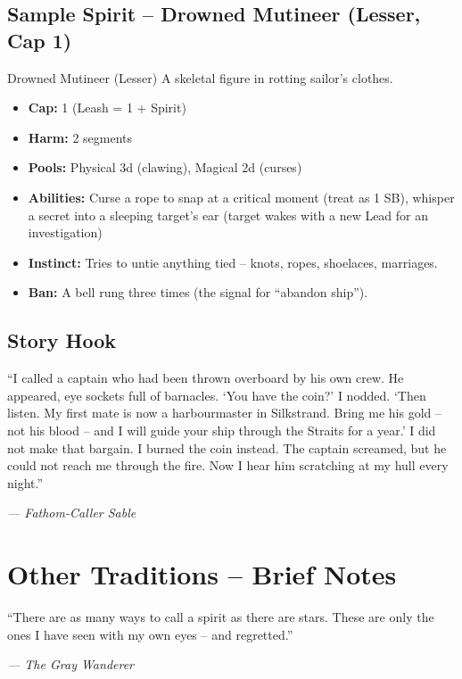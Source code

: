 \documentclass[10pt,a5paper]{book}
\begin{document}
\subsection*{Sample Spirit – Drowned Mutineer (Lesser, Cap 1)}
\begin{spiritcard}{Drowned Mutineer (Lesser)}
A skeletal figure in rotting sailor’s clothes.
\begin{itemize}
    \item \textbf{Cap:} 1 (Leash = 1 + Spirit)
    \item \textbf{Harm:} 2 segments
    \item \textbf{Pools:} Physical 3d (clawing), Magical 2d (curses)
    \item \textbf{Abilities:} Curse a rope to snap at a critical moment (treat as 1 SB), whisper a secret into a sleeping target’s ear (target wakes with a new Lead for an investigation)
    \item \textbf{Instinct:} Tries to untie anything tied – knots, ropes, shoelaces, marriages.
    \item \textbf{Ban:} A bell rung three times (the signal for “abandon ship”).
\end{itemize}
\end{spiritcard}

\subsection*{Story Hook}
\epigraph{“I called a captain who had been thrown overboard by his own crew. He appeared, eye sockets full of barnacles. ‘You have the coin?’ I nodded. ‘Then listen. My first mate is now a harbourmaster in Silkstrand. Bring me his gold – not his blood – and I will guide your ship through the Straits for a year.’ I did not make that bargain. I burned the coin instead. The captain screamed, but he could not reach me through the fire. Now I hear him scratching at my hull every night.”}{\textit{— Fathom-Caller Sable}}

\clearpage

\section{Other Traditions – Brief Notes}
\epigraph{“There are as many ways to call a spirit as there are stars. These are only the ones I have seen with my own eyes – and regretted.”}{\textit{— The Gray Wanderer}}
\end{document}
